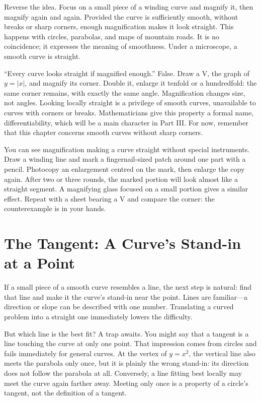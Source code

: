 Reverse the idea. Focus on a small piece of a winding curve and magnify it, then magnify again and again. Provided the curve is sufficiently smooth, without breaks or sharp corners, enough magnification makes it look straight. This happens with circles, parabolas, and maps of mountain roads. It is no coincidence; it expresses the meaning of smoothness. Under a microscope, a smooth curve is straight.

\begin{fanli}
``Every curve looks straight if magnified enough.'' False. Draw a V, the graph of $y=|x|$, and magnify its corner. Double it, enlarge it tenfold or a hundredfold: the same corner remains, with exactly the same angle. Magnification changes size, not angles. Looking locally straight is a privilege of smooth curves, unavailable to curves with corners or breaks. Mathematicians give this property a formal name, differentiability, which will be a main character in Part III. For now, remember that this chapter concerns smooth curves without sharp corners.
\end{fanli}

\begin{shiyan}
You can see magnification making a curve straight without special instruments. Draw a winding line and mark a fingernail-sized patch around one part with a pencil. Photocopy an enlargement centred on
the mark, then enlarge the copy again. After two or three rounds, the marked portion will look almost like a straight segment. A magnifying glass focused on a small portion gives a similar effect. Repeat with a sheet bearing a V and compare the corner: the counterexample is in your hands.
\end{shiyan}

\section{The Tangent: A Curve's Stand-in at a Point}

If a small piece of a smooth curve resembles a line, the next step is natural: find that line and make it the curve's stand-in near the point. Lines are familiar---a direction or slope can be described with one number. Translating a curved problem into a straight one immediately lowers the difficulty.

But which line is the best fit? A trap awaits. You might say that a tangent is a line touching the curve at only one point. That impression comes from circles and fails immediately for general curves. At the vertex of $y=x^2$, the vertical line also meets the parabola only once, but it is plainly the wrong stand-in: its direction does not follow the parabola at all. Conversely, a line fitting best locally may meet the curve again farther away. Meeting only once is a property of a circle's tangent, not the definition of a tangent.

